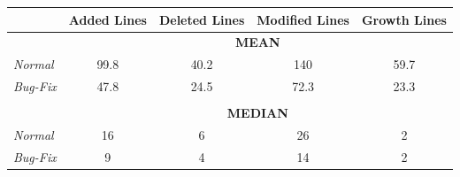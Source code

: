 \begin{table}[H]
	\centering
	\begin{tabular}{@{}lcccc@{}}
		\toprule
		& \multicolumn{1}{l}{\textbf{Added Lines}} & \multicolumn{1}{l}{\textbf{Deleted Lines}} & \multicolumn{1}{l}{\textbf{Modified Lines}} & \multicolumn{1}{l}{\textbf{Growth Lines}} \\ \midrule
		& \multicolumn{4}{c}{\textbf{MEAN}}                                                                                                                                               \\
		\textit{Normal}  & 99.8                                     & 40.2                                       & 140                                         & 59.7                                      \\
		\textit{Bug-Fix} & 47.8                                     & 24.5                                       & 72.3                                        & 23.3                                      \\
		& \multicolumn{1}{l}{}                     & \multicolumn{1}{l}{}                       & \multicolumn{1}{l}{}                        & \multicolumn{1}{l}{}                      \\
		& \multicolumn{4}{c}{\textbf{MEDIAN}}                                                                                                                                             \\
		\textit{Normal}  & 16                                       & 6                                          & 26                                          & 2                                         \\
		\textit{Bug-Fix} & 9                                        & 4                                          & 14                                          & 2                                         \\ \bottomrule
	\end{tabular}
\end{table}

